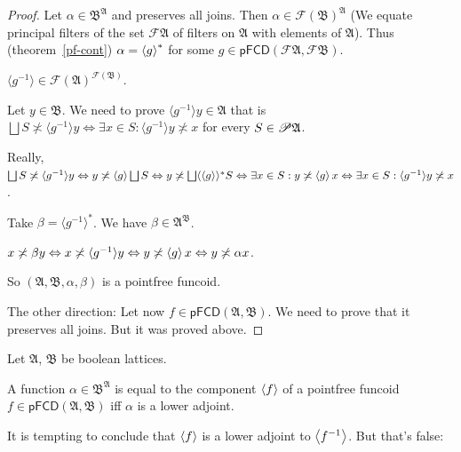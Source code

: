 \begin{proof}
  Let $\alpha \in \mathfrak{B}^{\mathfrak{A}}$ and preserves all joins. Then
  $\alpha \in \mathscr{F} (\mathfrak{B})^{\mathfrak{A}}$ (We equate principal
  filters of the set $\mathscr{F} \mathfrak{A}$ of filters on $\mathfrak{A}$
  with elements of $\mathfrak{A}$). Thus (theorem~\ref{pf-cont}) $\alpha = \left\langle g\right\rangle ^{\ast}$
  for some $g \in \mathsf{pFCD} \left( \mathscr{F} \mathfrak{A}, \mathscr{F}
  \mathfrak{B} \right)$.
  
  $\langle g^{- 1} \rangle \in \mathscr{F} (\mathfrak{A})^{\mathscr{F}
  (\mathfrak{B})}$.
  
  Let $y \in \mathfrak{B}$. We need to prove $\langle g^{- 1} \rangle y \in
  \mathfrak{A}$ that is $\bigsqcup S \nasymp \langle g^{- 1} \rangle y
  \Leftrightarrow \exists x \in S : \langle g^{- 1} \rangle y \nasymp x$ for
  every $S \in \mathscr{P} \mathfrak{A}$.
  
  Really, $\bigsqcup S \nasymp \langle g^{- 1} \rangle y \Leftrightarrow y
  \nasymp \supfun{g} \bigsqcup S \Leftrightarrow y \nasymp \bigsqcup
  \langle \supfun{g} \rangle^{\ast} S \Leftrightarrow \exists x \in S :
  y \nasymp \supfun{g} x \Leftrightarrow \exists x \in S : \langle g^{-
  1} \rangle y \nasymp x$.
  
  Take $\beta = \langle g^{- 1} \rangle^{\ast}$. We have $\beta \in
  \mathfrak{A}^{\mathfrak{B}}$.
  
  $x \not\asymp \beta y \Leftrightarrow x \not\asymp \langle g^{- 1} \rangle y
  \Leftrightarrow y \not\asymp \left\langle g\right\rangle x \Leftrightarrow y \not\asymp
  \alpha x$.
  
  So $(\mathfrak{A}, \mathfrak{B}, \alpha , \beta)$ is a pointfree funcoid.
  
  The other direction: Let now $f \in \mathsf{pFCD} (\mathfrak{A},
  \mathfrak{B})$. We need to prove that it preserves all joins. But it was
  proved above.
\end{proof}

\begin{conjecture}
  Let $\mathfrak{A}$, $\mathfrak{B}$ be boolean lattices.
  
  A function $\alpha \in \mathfrak{B}^{\mathfrak{A}}$ is equal to the
  component $\left\langle f\right\rangle$ of a pointfree funcoid $f \in \mathsf{pFCD}
  (\mathfrak{A}, \mathfrak{B})$ iff $\alpha$ is a lower adjoint.
\end{conjecture}

It is tempting to conclude that $\left\langle f\right\rangle$ is a lower adjoint to
$\left\langle f^{- 1}\right\rangle$. But that's false:

